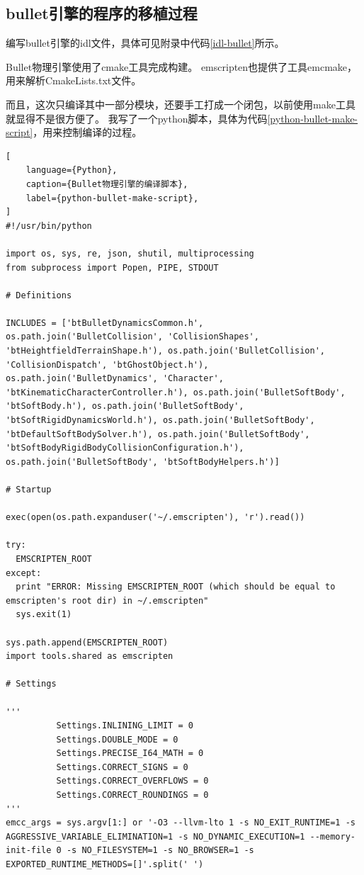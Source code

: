 \subsection{bullet引擎的程序的移植过程}

编写bullet引擎的idl文件，具体可见附录中代码\ref{idl-bullet}所示。

Bullet物理引擎使用了cmake工具完成构建。
emscripten也提供了工具emcmake，用来解析CmakeLists.txt文件。

而且，这次只编译其中一部分模块，还要手工打成一个闭包，以前使用make工具就显得不是很方便了。
我写了一个python脚本，具体为代码\ref{python-bullet-make-script}，用来控制编译的过程。

\begin{lstlisting}[
    language={Python},
    caption={Bullet物理引擎的编译脚本},
    label={python-bullet-make-script},
]
#!/usr/bin/python

import os, sys, re, json, shutil, multiprocessing
from subprocess import Popen, PIPE, STDOUT

# Definitions

INCLUDES = ['btBulletDynamicsCommon.h', os.path.join('BulletCollision', 'CollisionShapes', 'btHeightfieldTerrainShape.h'), os.path.join('BulletCollision', 'CollisionDispatch', 'btGhostObject.h'), os.path.join('BulletDynamics', 'Character', 'btKinematicCharacterController.h'), os.path.join('BulletSoftBody', 'btSoftBody.h'), os.path.join('BulletSoftBody', 'btSoftRigidDynamicsWorld.h'), os.path.join('BulletSoftBody', 'btDefaultSoftBodySolver.h'), os.path.join('BulletSoftBody', 'btSoftBodyRigidBodyCollisionConfiguration.h'), os.path.join('BulletSoftBody', 'btSoftBodyHelpers.h')]

# Startup

exec(open(os.path.expanduser('~/.emscripten'), 'r').read())

try:
  EMSCRIPTEN_ROOT
except:
  print "ERROR: Missing EMSCRIPTEN_ROOT (which should be equal to emscripten's root dir) in ~/.emscripten"
  sys.exit(1)

sys.path.append(EMSCRIPTEN_ROOT)
import tools.shared as emscripten

# Settings

'''
          Settings.INLINING_LIMIT = 0
          Settings.DOUBLE_MODE = 0
          Settings.PRECISE_I64_MATH = 0
          Settings.CORRECT_SIGNS = 0
          Settings.CORRECT_OVERFLOWS = 0
          Settings.CORRECT_ROUNDINGS = 0
'''
emcc_args = sys.argv[1:] or '-O3 --llvm-lto 1 -s NO_EXIT_RUNTIME=1 -s AGGRESSIVE_VARIABLE_ELIMINATION=1 -s NO_DYNAMIC_EXECUTION=1 --memory-init-file 0 -s NO_FILESYSTEM=1 -s NO_BROWSER=1 -s EXPORTED_RUNTIME_METHODS=[]'.split(' ')


\end{lstlisting}
